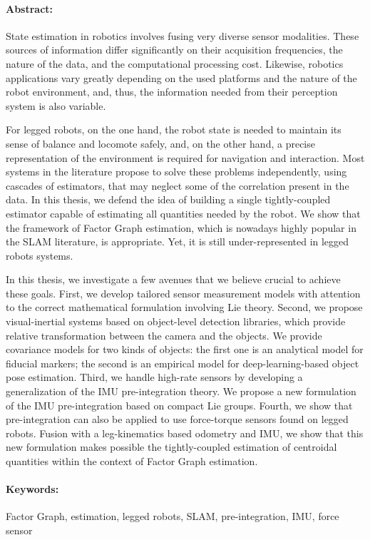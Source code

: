 \newpage

\vspace{5cm}

\paragraph{Abstract:}

State estimation in robotics involves fusing very diverse sensor modalities.
These sources of information differ significantly on their acquisition frequencies, the nature of the data, 
and the computational processing cost. Likewise, robotics applications vary greatly depending on the used
platforms and the nature of the robot environment, and, thus, the information needed from their perception system is also variable.

For legged robots, on the one hand, the robot state is needed to maintain its sense of balance and locomote safely, and,
on the other hand, a precise representation of the environment is required for navigation and interaction. Most systems in the literature propose to solve
these problems independently, using cascades of estimators, that may neglect some of the correlation present in the data. 
In this thesis, we defend the idea of building a single tightly-coupled estimator capable of estimating all quantities needed by the robot. 
We show that the framework of Factor Graph estimation, which is nowadays highly popular in the SLAM literature, is appropriate. 
Yet, it is still under-represented in legged robots systems.

In this thesis, we investigate a few avenues that we believe crucial to achieve these goals. First, we develop tailored sensor measurement models with attention to the correct mathematical formulation involving Lie theory.
Second, we propose visual-inertial systems based on object-level detection libraries, which provide relative transformation between the camera and the objects.
We provide covariance models for two kinds of objects: the first one is an analytical model for fiducial markers; the second
is an empirical model for deep-learning-based object pose estimation.
Third, we handle high-rate sensors by developing a generalization of the IMU pre-integration theory. We propose a new formulation of the IMU
pre-integration based on compact Lie groups. 
Fourth, we show that pre-integration can also be applied to use force-torque sensors found on legged robots. 
Fusion with a leg-kinematics based odometry and IMU, we show that this new formulation makes possible the tightly-coupled estimation
of centroidal quantities within the context of Factor Graph estimation.



\paragraph{Keywords:}

Factor Graph, estimation, legged robots, SLAM, pre-integration, IMU, force sensor 
